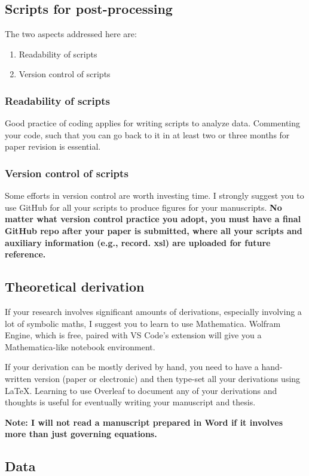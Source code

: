 \documentclass[12pt]{article}
\begin{document}
\subsection{Scripts for post-processing}\label{sec:script}
The two aspects addressed here are:
\begin{enumerate}
    \item Readability of scripts
    \item Version control of scripts
\end{enumerate}

\subsubsection{Readability of scripts}
Good practice of coding applies for writing scripts to analyze data. Commenting your code, such that you can go back to it in at least two or three months for paper revision is essential. 
\subsubsection{Version control of scripts}
Some efforts in version control are worth investing time. I strongly suggest you to use GitHub for all your scripts to produce figures for your manuscripts. \large{\textbf{No matter what version control practice you adopt, you must have a final GitHub repo after your paper is submitted, where all your scripts and auxiliary information (e.g., record. xsl) are uploaded for future reference.}}

\subsection{Theoretical derivation}
If your research involves significant amounts of derivations, especially involving a lot of symbolic maths, I suggest you to learn to use Mathematica. Wolfram Engine, which is free, paired with VS Code's extension will give you a Mathematica-like notebook environment. 

If your derivation can be mostly derived by hand, you need to have a hand-written version (paper or electronic) and then type-set all your derivations using \LaTeX. Learning to use Overleaf to document any of your derivations and thoughts is useful for eventually writing your manuscript and thesis.

\large{\textbf{Note: I will not read a manuscript prepared in Word if it involves more than just governing equations.}}

\subsection{Data}\label{sec:data}
\end{document}
